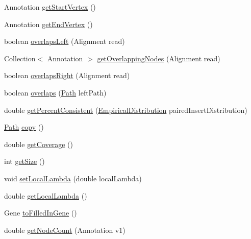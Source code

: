 \begin{DoxyCompactItemize}
\item 
Annotation \hyperlink{classbroad_1_1pda_1_1seq_1_1graph_1_1_path_a671e412fbad1e7845efc842e3c67e5c4}{get\+Start\+Vertex} ()
\item 
Annotation \hyperlink{classbroad_1_1pda_1_1seq_1_1graph_1_1_path_a531ea71c00d0f6aae528d2bc576ecd43}{get\+End\+Vertex} ()
\item 
boolean \hyperlink{classbroad_1_1pda_1_1seq_1_1graph_1_1_path_ae8a49a076361868f345bb4f06ea52e3c}{overlaps\+Left} (Alignment read)
\item 
Collection$<$ Annotation $>$ \hyperlink{classbroad_1_1pda_1_1seq_1_1graph_1_1_path_ac04ef0dc00df0156632abeaf208c66fc}{get\+Overlapping\+Nodes} (Alignment read)
\item 
boolean \hyperlink{classbroad_1_1pda_1_1seq_1_1graph_1_1_path_ad970a34e2dac16b2bbf21e3739ae5a0a}{overlaps\+Right} (Alignment read)
\item 
boolean \hyperlink{classbroad_1_1pda_1_1seq_1_1graph_1_1_path_a0cb3f299b39f6b3141ac1b83967a7a51}{overlaps} (\hyperlink{classbroad_1_1pda_1_1seq_1_1graph_1_1_path}{Path} left\+Path)
\item 
double \hyperlink{classbroad_1_1pda_1_1seq_1_1graph_1_1_path_a85749f3f13bf21ae8f40d6643a01867a}{get\+Percent\+Consistent} (\hyperlink{classbroad_1_1core_1_1math_1_1_empirical_distribution}{Empirical\+Distribution} paired\+Insert\+Distribution)
\item 
\hyperlink{classbroad_1_1pda_1_1seq_1_1graph_1_1_path}{Path} \hyperlink{classbroad_1_1pda_1_1seq_1_1graph_1_1_path_a16cab9392b06f9a4860df6690ba24c07}{copy} ()
\item 
double \hyperlink{classbroad_1_1pda_1_1seq_1_1graph_1_1_path_a0404541c8aaadbef81224e9925bb3c2f}{get\+Coverage} ()
\item 
int \hyperlink{classbroad_1_1pda_1_1seq_1_1graph_1_1_path_aab1fa671b2c90cac37a657f5ead8e00a}{get\+Size} ()
\item 
void \hyperlink{classbroad_1_1pda_1_1seq_1_1graph_1_1_path_ab5c25356357ea84331de7384dbf44acf}{set\+Local\+Lambda} (double local\+Lambda)
\item 
double \hyperlink{classbroad_1_1pda_1_1seq_1_1graph_1_1_path_a2d1abad788b58cac224885272cf117a7}{get\+Local\+Lambda} ()
\item 
Gene \hyperlink{classbroad_1_1pda_1_1seq_1_1graph_1_1_path_a985617335f60470040cd6e9534d815d6}{to\+Filled\+In\+Gene} ()
\item 
double \hyperlink{classbroad_1_1pda_1_1seq_1_1graph_1_1_path_a831d48efb7c551f60eb6b26a18f6e8f2}{get\+Node\+Count} (Annotation v1)

\end{DoxyCompactItemize}
